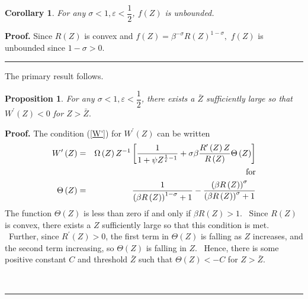 \documentclass{article}
\newtheorem{corollary}[theorem]{Corollary}
\newtheorem{proposition}[theorem]{Proposition}
\newenvironment{proof}[1][Proof]{\noindent\textbf{#1.} }{\ \rule{0.5em}{0.5em}}
\begin{document}
\begin{doublespace}
\begin{corollary}
For any $\sigma <1,\varepsilon <\dfrac{1}{2}$, $f\left( Z\right) $ is
unbounded.
\end{corollary}

\begin{proof}
Since $R\left( Z\right) $ is convex and $f\left( Z\right) =\beta ^{-\sigma
}R\left( Z\right) ^{1-\sigma },$ $f\left( Z\right) $ is unbounded since $%
1-\sigma >0$.
\end{proof}

The primary result follows.

\begin{proposition}
For any $\sigma <1,\varepsilon <\dfrac{1}{2}$, there exists a $\bar{Z}$
sufficiently large so that $W^{\prime }\left( Z\right) <0$ for $Z>\bar{Z}.$
\end{proposition}

\begin{proof}
The condition (\ref{W'}) for $W^{\prime }\left( Z\right) $ can be written%
\begin{eqnarray}
W^{\prime }\left( Z\right) &=&\Omega \left( Z\right) Z^{-1}\left[ \frac{1}{%
1+\psi Z^{\frac{1}{\varepsilon }-1}}+\sigma \beta \frac{R^{\prime }\left(
Z\right) Z}{R\left( Z\right) }\Theta \left( Z\right) \right]
\label{W prime prop} \\
&&\text{for}  \notag \\
\Theta \left( Z\right) &=&\frac{1}{\left( \beta R\left( Z\right) \right)
^{1-\sigma }+1}-\frac{\left( \beta R\left( Z\right) \right) ^{\sigma }}{%
\left( \beta R\left( Z\right) \right) ^{\sigma }+1}  \notag
\end{eqnarray}%
The function $\Theta \left( Z\right) $ is less than zero if and only if $%
\beta R\left( Z\right) >1$. \ Since $R\left( Z\right) $ is convex, there
exists a $Z$ sufficiently large so that this condition is met. \ Further,
since $R^{\prime }\left( Z\right) >0$, the first term in $\Theta \left(
Z\right) $ is falling as $Z$ increases, and the second term increasing, so $%
\Theta \left( Z\right) $ is falling in $Z.$ \ Hence, there is some positive
constant $C$ and threshold $\bar{Z}$ such that $\Theta \left( Z\right) <-C$
for $Z>\bar{Z}$.


\end{proof}
\end{doublespace}
\end{document}
